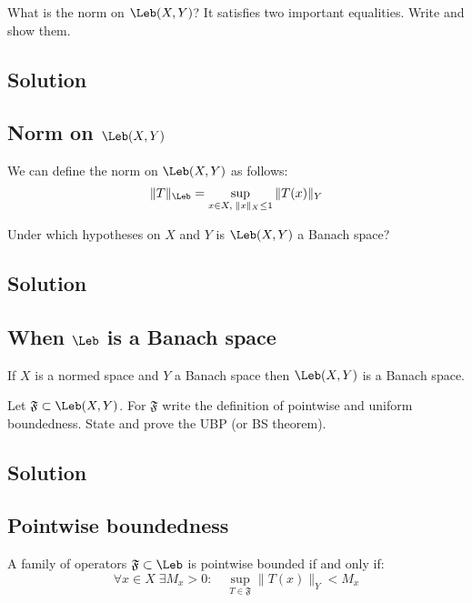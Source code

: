 \sheet


\question
What is the norm on $\Leb(X,Y)$? It satisfies two important equalities. Write and show them.

\subsection*{Solution}

\subsection{Norm on \texorpdfstring{$\Leb(X,Y)$}{the space of continuous operators}}
We can define the norm on $\Leb(X,Y)$ as follows:
\[ \| T \|_{\Leb} = \sup_{x\in X, \; \|x\|_X\leq1} \|T(x)\|_Y \]



\question
Under which hypotheses on $X$ and $Y$ is $\Leb(X,Y)$ a Banach space?

\subsection*{Solution}

\subsection{When \texorpdfstring{$\Leb$}{the space of continuous operators} is a Banach space}
If $X$ is a normed space and $Y$ a Banach space then $\Leb(X,Y)$ is a Banach space.


\question
Let $\mathfrak{F} \subset \Leb(X,Y)$. For $\mathfrak{F}$ write the definition of pointwise and uniform boundedness. State and prove the UBP (or BS theorem).

\subsection*{Solution}

\subsection{Pointwise boundedness}
A family of operators $\mathfrak{F} \subset \Leb$ is pointwise bounded if and only if:
\[ \forall x \in X \; \exists M_x > 0: \quad \sup_{T\in\mathfrak{F}} \|T(x)\|_Y < M_x \]


